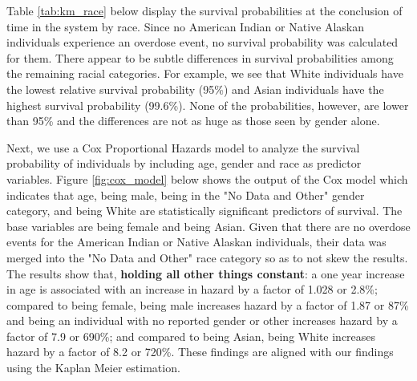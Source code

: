 \documentclass[twoside,10.5pt]{article}
\begin{document}
Table \ref{tab:km_race} below display the survival probabilities at the conclusion of time in the system by race. Since no American Indian or Native Alaskan individuals experience an overdose event, no survival probability was calculated for them. There appear to be subtle differences in survival probabilities among the remaining racial categories. For example, we see that White individuals have the lowest relative survival probability (95\%) and Asian individuals have the highest survival probability (99.6\%). None of the probabilities, however, are lower than 95\% and the differences are not as huge as those seen by gender alone. 

\begin{table}[h!]
  \begin{center}
    \caption{Probability of survival by Race}
    \label{tab:km_race}
  \end{center}
\end{table}

Next, we use a Cox Proportional Hazards model to analyze the survival probability of individuals by including age, gender and race as predictor variables. Figure \ref{fig:cox_model} below shows the output of the Cox model which indicates that age, being male, being in the "No Data and Other" gender category, and being White are statistically significant predictors of survival. The base variables are being female and being Asian. Given that there are no overdose events for the American Indian or Native Alaskan individuals, their data was merged into the "No Data and Other" race category so as to not skew the results. The results show that, \textbf{holding all other things constant}: a one year increase in age is associated with an increase in hazard by a factor of 1.028 or 2.8\%; compared to being female, being male increases hazard by a factor of 1.87 or 87\% and being an individual with no reported gender or other increases hazard by a factor of 7.9 or 690\%; and compared to being Asian, being White increases hazard by a factor of 8.2 or 720\%. These findings are aligned with our findings using the Kaplan Meier estimation. 
\end{document}
